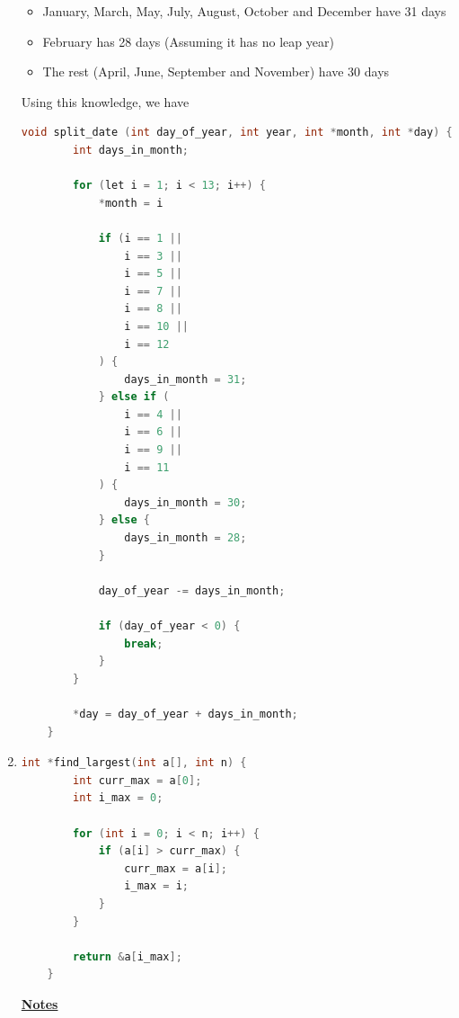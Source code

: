 \documentclass[12pt]{article}
\begin{document}
\begin{enumerate}[1.]
    \begin{itemize}
        \item January, March, May, July, August, October and December have 31 days
        \item February has 28 days (Assuming it has no leap year)
        \item The rest (April, June, September and November) have 30 days
    \end{itemize}

    \bigskip

    Using this knowledge, we have


\begin{lstlisting}[language=c]
    void split_date (int day_of_year, int year, int *month, int *day) {
        int days_in_month;

        for (let i = 1; i < 13; i++) {
            *month = i

            if (i == 1 ||
                i == 3 ||
                i == 5 ||
                i == 7 ||
                i == 8 ||
                i == 10 ||
                i == 12
            ) {
                days_in_month = 31;
            } else if (
                i == 4 ||
                i == 6 ||
                i == 9 ||
                i == 11
            ) {
                days_in_month = 30;
            } else {
                days_in_month = 28;
            }

            day_of_year -= days_in_month;

            if (day_of_year < 0) {
                break;
            }
        }

        *day = day_of_year + days_in_month;
    }
\end{lstlisting}

    \item

    \bigskip

\begin{lstlisting}[language=c]
    int *find_largest(int a[], int n) {
        int curr_max = a[0];
        int i_max = 0;

        for (int i = 0; i < n; i++) {
            if (a[i] > curr_max) {
                curr_max = a[i];
                i_max = i;
            }
        }

        return &a[i_max];
    }
\end{lstlisting}

    \bigskip

    \underline{\textbf{Notes}}


\end{enumerate}
\end{document}

